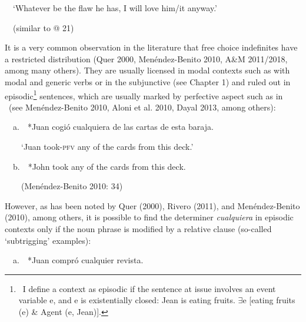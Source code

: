 \begin{styleStandard}
\ \ ‘Whatever be the flaw he has, I will love him/it anyway.’
\end{styleStandard}

\begin{styleStandard}
\ \ (similar to @ 21)
\end{styleStandard}

\begin{styleStandard}
It is a very common observation in the literature that free choice indefinites have a restricted distribution (Quer 2000, Menéndez-Benito 2010, A\&M 2011/2018, among many others). They are usually licensed in modal contexts such as with modal and generic verbs or in the subjunctive (see Chapter 1) and ruled out in episodic\footnote{\textrm{\ I define a context as episodic if the sentence at issue involves an event variable e, and e is existentially closed: Jean is eating fruits. ${\exists}$e [eating fruits (e) \& Agent (e, Jean)].}} sentences, which are usually marked by perfective aspect such as in \ (see Menéndez-Benito 2010, Aloni et al. 2010, Dayal 2013, among others):
\end{styleStandard}

\begin{styleStandard}
\label{bkm:Ref41139913}\ \ a.\ \ *Juan cogió cualquiera de las cartas de esta baraja.
\end{styleStandard}

\begin{styleStandard}
\ \ \ \ ‘Juan took-\textsc{pfv} any of the cards from this deck.’
\end{styleStandard}

\begin{styleStandard}
\ \ b.\ \ *John took any of the cards from this deck. 
\end{styleStandard}

\begin{styleStandard}
\ \ \ \ (Menéndez-Benito 2010: 34)
\end{styleStandard}

\begin{styleStandard}
However, as has been noted by Quer (2000), Rivero (2011), and Menéndez-Benito (2010), among others, it is possible to find the determiner \textit{cualquiera} in episodic contexts only if the noun phrase is modified by a relative clause (so-called ‘subtrigging’ examples):
\end{styleStandard}

\begin{styleStandard}
\label{bkm:Ref41139369}\ \ a.\ \ *Juan compró cualquier revista.
\end{styleStandard}

